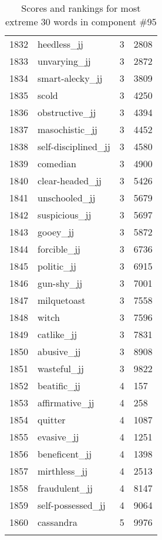 \begin{longtable}[!htbp]{| rlr@{.}l |}
    1832 & heedless\_jj & 3 & 2808 \\
    1833 & unvarying\_jj & 3 & 2872 \\
    1834 & smart-alecky\_jj & 3 & 3809 \\
    1835 & scold & 3 & 4250 \\
    1836 & obstructive\_jj & 3 & 4394 \\
    1837 & masochistic\_jj & 3 & 4452 \\
    1838 & self-disciplined\_jj & 3 & 4580 \\
    1839 & comedian & 3 & 4900 \\
    1840 & clear-headed\_jj & 3 & 5426 \\
    1841 & unschooled\_jj & 3 & 5679 \\
    1842 & suspicious\_jj & 3 & 5697 \\
    1843 & gooey\_jj & 3 & 5872 \\
    1844 & forcible\_jj & 3 & 6736 \\
    1845 & politic\_jj & 3 & 6915 \\
    1846 & gun-shy\_jj & 3 & 7001 \\
    1847 & milquetoast & 3 & 7558 \\
    1848 & witch & 3 & 7596 \\
    1849 & catlike\_jj & 3 & 7831 \\
    1850 & abusive\_jj & 3 & 8908 \\
    1851 & wasteful\_jj & 3 & 9822 \\
    1852 & beatific\_jj & 4 & 157 \\
    1853 & affirmative\_jj & 4 & 258 \\
    1854 & quitter & 4 & 1087 \\
    1855 & evasive\_jj & 4 & 1251 \\
    1856 & beneficent\_jj & 4 & 1398 \\
    1857 & mirthless\_jj & 4 & 2513 \\
    1858 & fraudulent\_jj & 4 & 8147 \\
    1859 & self-possessed\_jj & 4 & 9064 \\
    1860 & cassandra & 5 & 9976 \\
    \hline
    \caption{Scores and rankings for most extreme 30 words in component \#95} \\
\end{longtable}
